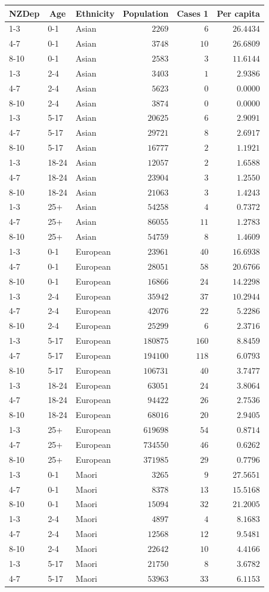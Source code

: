 \documentclass{article}
\begin{document}
\begin{table}[hbtp] \scriptsize
\captionsetup{width=1\textwidth}
\begin{center}
\begin{tabular}{lllrrr}
\hline\hline
\multicolumn{1}{c}{NZDep}&\multicolumn{1}{c}{Age}&\multicolumn{1}{c}{Ethnicity}&\multicolumn{1}{c}{Population}&\multicolumn{1}{c}{Cases 1}&\multicolumn{1}{c}{Per capita}\tabularnewline
\hline
1-3&0-1&Asian&$  2269$&$  6$&$26.4434$\tabularnewline
4-7&0-1&Asian&$  3748$&$ 10$&$26.6809$\tabularnewline
8-10&0-1&Asian&$  2583$&$  3$&$11.6144$\tabularnewline
1-3&2-4&Asian&$  3403$&$  1$&$ 2.9386$\tabularnewline
4-7&2-4&Asian&$  5623$&$  0$&$ 0.0000$\tabularnewline
8-10&2-4&Asian&$  3874$&$  0$&$ 0.0000$\tabularnewline
1-3&5-17&Asian&$ 20625$&$  6$&$ 2.9091$\tabularnewline
4-7&5-17&Asian&$ 29721$&$  8$&$ 2.6917$\tabularnewline
8-10&5-17&Asian&$ 16777$&$  2$&$ 1.1921$\tabularnewline
1-3&18-24&Asian&$ 12057$&$  2$&$ 1.6588$\tabularnewline
4-7&18-24&Asian&$ 23904$&$  3$&$ 1.2550$\tabularnewline
8-10&18-24&Asian&$ 21063$&$  3$&$ 1.4243$\tabularnewline
1-3&25+&Asian&$ 54258$&$  4$&$ 0.7372$\tabularnewline
4-7&25+&Asian&$ 86055$&$ 11$&$ 1.2783$\tabularnewline
8-10&25+&Asian&$ 54759$&$  8$&$ 1.4609$\tabularnewline
1-3&0-1&European&$ 23961$&$ 40$&$16.6938$\tabularnewline
4-7&0-1&European&$ 28051$&$ 58$&$20.6766$\tabularnewline
8-10&0-1&European&$ 16866$&$ 24$&$14.2298$\tabularnewline
1-3&2-4&European&$ 35942$&$ 37$&$10.2944$\tabularnewline
4-7&2-4&European&$ 42076$&$ 22$&$ 5.2286$\tabularnewline
8-10&2-4&European&$ 25299$&$  6$&$ 2.3716$\tabularnewline
1-3&5-17&European&$180875$&$160$&$ 8.8459$\tabularnewline
4-7&5-17&European&$194100$&$118$&$ 6.0793$\tabularnewline
8-10&5-17&European&$106731$&$ 40$&$ 3.7477$\tabularnewline
1-3&18-24&European&$ 63051$&$ 24$&$ 3.8064$\tabularnewline
4-7&18-24&European&$ 94422$&$ 26$&$ 2.7536$\tabularnewline
8-10&18-24&European&$ 68016$&$ 20$&$ 2.9405$\tabularnewline
1-3&25+&European&$619698$&$ 54$&$ 0.8714$\tabularnewline
4-7&25+&European&$734550$&$ 46$&$ 0.6262$\tabularnewline
8-10&25+&European&$371985$&$ 29$&$ 0.7796$\tabularnewline
1-3&0-1&Maori&$  3265$&$  9$&$27.5651$\tabularnewline
4-7&0-1&Maori&$  8378$&$ 13$&$15.5168$\tabularnewline
8-10&0-1&Maori&$ 15094$&$ 32$&$21.2005$\tabularnewline
1-3&2-4&Maori&$  4897$&$  4$&$ 8.1683$\tabularnewline
4-7&2-4&Maori&$ 12568$&$ 12$&$ 9.5481$\tabularnewline
8-10&2-4&Maori&$ 22642$&$ 10$&$ 4.4166$\tabularnewline
1-3&5-17&Maori&$ 21750$&$  8$&$ 3.6782$\tabularnewline
4-7&5-17&Maori&$ 53963$&$ 33$&$ 6.1153$\tabularnewline

\end{tabular}
\end{center}
\end{table}
\end{document}

